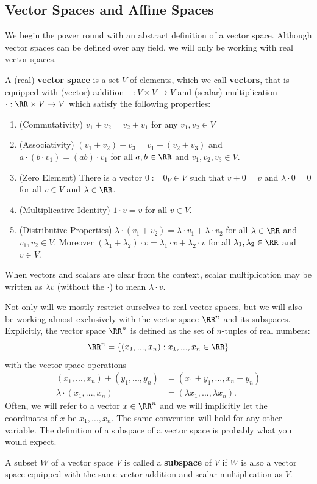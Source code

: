 \documentclass[11pt]{article}
\begin{document}
\subsection{Vector Spaces and Affine Spaces}

We begin the power round with an abstract definition of a vector space. Although vector spaces can be defined over any field, we will only be working with real vector spaces. 

\begin{defn}
    A (real) \textbf{vector space} is a set $V$ of elements, which we call \textbf{vectors}, that is equipped with (vector) addition $+ : V \times V \to V$ and (scalar) multiplication $\cdot : \RR \times V \to V$ which satisfy the following properties:
    \begin{enumerate}
        \item (Commutativity) $v_1 + v_2 = v_2 + v_1$ for any $v_1, v_2 \in V$
        \item (Associativity) $(v_1 + v_2) + v_3 = v_1 + (v_2 + v_3)$ and $a \cdot (b \cdot v_1) = (ab) \cdot v_1$ for all $a, b \in \RR$ and $v_1, v_2, v_3 \in V$. 
        \item (Zero Element) There is a vector $0 := 0_V \in V$ such that $v + 0 = v$ and $\lambda \cdot 0 = 0$ for all $v \in V$ and $\lambda \in \RR$. 
        \item (Multiplicative Identity) $1 \cdot v = v$ for all $v \in V$. 
        \item (Distributive Properties) $\lambda \cdot (v_1 + v_2) = \lambda \cdot v_1 + \lambda \cdot v_2$ for all $\lambda \in \RR$ and $v_1, v_2 \in V$. Moreover $(\lambda_1 + \lambda_2) \cdot v = \lambda_1 \cdot v + \lambda_2 \cdot v$ for all $\lambda_1, \lambda_2 \in \RR$ and $v \in V$. 
    \end{enumerate}
    When vectors and scalars are clear from the context, scalar multiplication may be written as $\lambda v$ (without the $\cdot$) to mean $\lambda \cdot v$. 
\end{defn}

Not only will we mostly restrict ourselves to real vector spaces, but we will also be working almost exclusively with the vector space $\RR^n$ and its subspaces. Explicitly, the vector space $\RR^n$ is defined as the set of $n$-tuples of real numbers: 
\[
    \RR^n = \{(x_1, ..., x_n) : x_1, ..., x_n \in \RR\}
\]
with the vector space operations 
\begin{align*}
(x_1, ..., x_n) + (y_1, ..., y_n) & = (x_1 + y_1, ..., x_n + y_n) \\
\lambda \cdot (x_1, ..., x_n) & = (\lambda x_1, ..., \lambda x_n).
\end{align*} 
Often, we will refer to a vector $x \in \RR^n$ and we will implicitly let the coordinates of $x$ be $x_1, \ldots, x_n$. The same convention will hold for any other variable. The definition of a subspace of a vector space is probably what you would expect.  
\begin{defn}
    A subset $W$ of a vector space $V$ is called a \textbf{subspace} of $V$ if $W$ is also a vector space equipped with the same vector addition and scalar multiplication as $V$. 
\end{defn}
\end{document}
